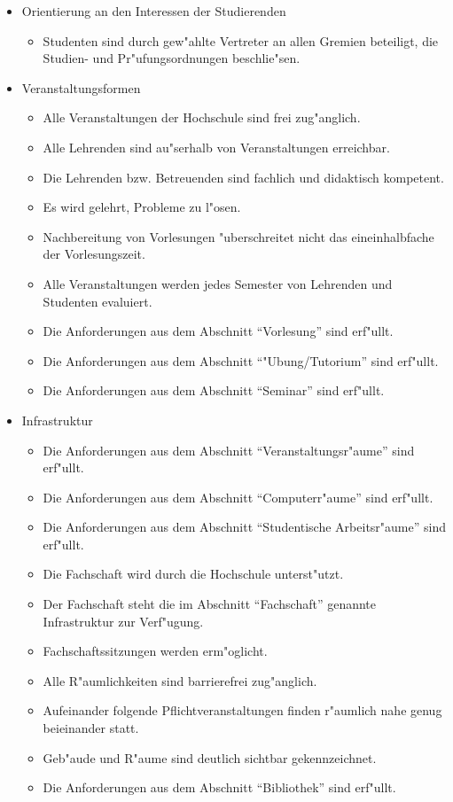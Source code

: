 \begin{itemize}
\item Orientierung an den Interessen der Studierenden
 \begin{itemize}
 \item Studenten sind durch gew"ahlte Vertreter an allen Gremien beteiligt, die Studien- und Pr"ufungsordnungen beschlie"sen.
 \end{itemize}

\item Veranstaltungsformen
 \begin{itemize}
 \item Alle Veranstaltungen der Hochschule sind frei zug"anglich.
 \item Alle Lehrenden sind au"serhalb von Veranstaltungen erreichbar.
 \item Die Lehrenden bzw. Betreuenden sind fachlich und didaktisch kompetent.
 \item Es wird gelehrt, Probleme zu l"osen.
 \item Nachbereitung von Vorlesungen "uberschreitet nicht das eineinhalbfache der Vorlesungszeit.
 \item Alle Veranstaltungen werden jedes Semester von Lehrenden und Studenten evaluiert.
 \item Die Anforderungen aus dem Abschnitt "`Vorlesung"' sind erf"ullt.
 \item Die Anforderungen aus dem Abschnitt "`"Ubung/Tutorium"' sind erf"ullt.
 \item Die Anforderungen aus dem Abschnitt "`Seminar"' sind erf"ullt.
 \end{itemize}

\item Infrastruktur
 \begin{itemize}
 \item Die Anforderungen aus dem Abschnitt "`Veranstaltungsr"aume"' sind erf"ullt.
 \item Die Anforderungen aus dem Abschnitt "`Computerr"aume"' sind erf"ullt.
 \item Die Anforderungen aus dem Abschnitt "`Studentische Arbeitsr"aume"' sind erf"ullt.
 \item Die Fachschaft wird durch die Hochschule unterst"utzt.
 \item Der Fachschaft steht die im Abschnitt "`Fachschaft"' genannte Infrastruktur zur Verf"ugung.
 \item Fachschaftssitzungen werden erm"oglicht.
 \item Alle R"aumlichkeiten sind barrierefrei zug"anglich.
 \item Aufeinander folgende Pflichtveranstaltungen finden r"aumlich nahe genug beieinander statt.
 \item Geb"aude und R"aume sind deutlich sichtbar gekennzeichnet.
 \item Die Anforderungen aus dem Abschnitt "`Bibliothek"' sind erf"ullt.
 \end{itemize}


\end{itemize}
